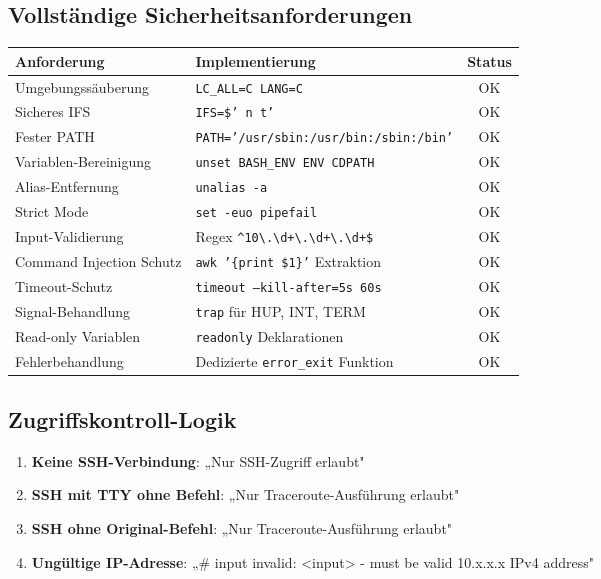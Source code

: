\documentclass[10pt,a4paper]{article}
\begin{document}
\subsection*{Vollständige Sicherheitsanforderungen}

\begin{center}
\begin{tabular}{|l|l|c|}
\hline
\textbf{Anforderung} & \textbf{Implementierung} & \textbf{Status} \\
\hline
Umgebungssäuberung & \texttt{LC\_ALL=C LANG=C} & OK \\
Sicheres IFS & \texttt{IFS=\$'\\n\\t'} & OK \\
Fester PATH & \texttt{PATH='/usr/sbin:/usr/bin:/sbin:/bin'} & OK \\
Variablen-Bereinigung & \texttt{unset BASH\_ENV ENV CDPATH} & OK \\
Alias-Entfernung & \texttt{unalias -a} & OK \\
Strict Mode & \texttt{set -euo pipefail} & OK \\
Input-Validierung & Regex \texttt{\^{}10\textbackslash.\textbackslash d+\textbackslash.\textbackslash d+\textbackslash.\textbackslash d+\$} & OK \\
Command Injection Schutz & \texttt{awk '\{print \$1\}'} Extraktion & OK \\
Timeout-Schutz & \texttt{timeout --kill-after=5s 60s} & OK \\
Signal-Behandlung & \texttt{trap} für HUP, INT, TERM & OK \\
Read-only Variablen & \texttt{readonly} Deklarationen & OK \\
Fehlerbehandlung & Dedizierte \texttt{error\_exit} Funktion & OK \\
\hline
\end{tabular}
\end{center}

\subsection*{Zugriffskontroll-Logik}

\begin{enumerate}[leftmargin=*]
    \item \textbf{Keine SSH-Verbindung}: „Nur SSH-Zugriff erlaubt"
    \item \textbf{SSH mit TTY ohne Befehl}: „Nur Traceroute-Ausführung erlaubt"
    \item \textbf{SSH ohne Original-Befehl}: „Nur Traceroute-Ausführung erlaubt"
    \item \textbf{Ungültige IP-Adresse}: „\# input invalid: <input> - must be valid 10.x.x.x IPv4 address"
\end{enumerate}
\end{document}
